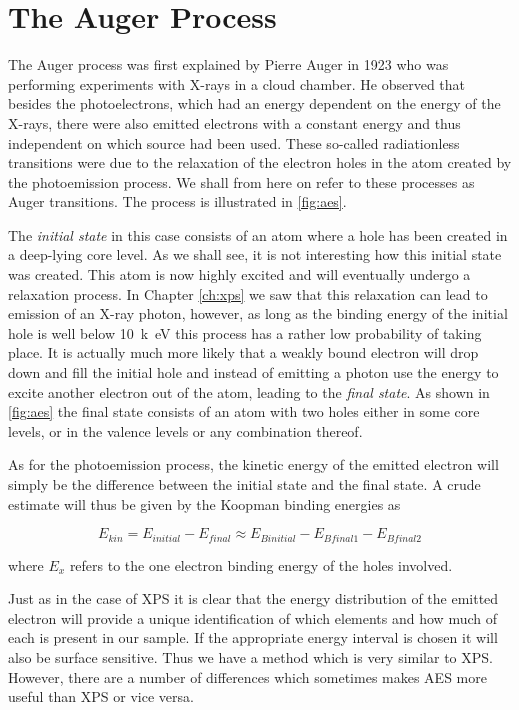 \chapter{The Auger Process}\label{ch:auger}
The Auger process was first explained by  Pierre Auger in 1923 who was performing experiments with X-rays in a cloud chamber. He observed that besides the photoelectrons, which had an energy dependent on the energy of the X-rays, there were also emitted electrons with a constant energy and thus independent on which source had been used. These so-called radiationless transitions were due  to the relaxation of the electron holes in the atom created by the photoemission process. We shall from here on refer to these processes as Auger transitions. The process is illustrated in \autoref{fig:aes}.

The {\em initial state} in this case consists of an atom where a hole has been created in a deep-lying core level. As we shall see, it is not interesting how this initial state was created. This atom is now highly excited and will eventually undergo a relaxation process. In Chapter \ref{ch:xps} we saw that this relaxation can lead to emission of an X-ray photon, however, as long as the binding energy of the initial hole is well below \SI{10}{k\electronvolt} this process has a rather low probability of taking place. It is actually much more likely that a  weakly bound electron will drop down and fill the initial hole and instead of emitting a photon use the energy to excite another electron out of the atom, leading to the {\em final state}. As  shown in \autoref{fig:aes} the final state consists of an atom with two holes either in some core levels, or in the  valence  levels or any combination thereof.

As for the photoemission process, the  kinetic energy of the emitted electron will simply be the difference between the initial state and the final state. A crude estimate will thus be given by the Koopman binding energies as

\begin{equation}\label{eq:ekinkoopman}
E_{kin}=E_{initial}-E_{final}\approx E_{B          initial}-E_{Bfinal1}-E_{Bfinal2}
\end{equation}

\noindent where $E_x$ refers to the one electron binding energy of the holes involved.

Just as in the case of XPS it is clear that the energy distribution of the emitted electron will provide a unique identification of which elements and how much of each is present in our sample. If the appropriate energy interval is chosen it will also be surface sensitive. Thus we have a method which is very  similar  to XPS. However, there are a number of differences which sometimes makes AES more useful than XPS or vice versa.

